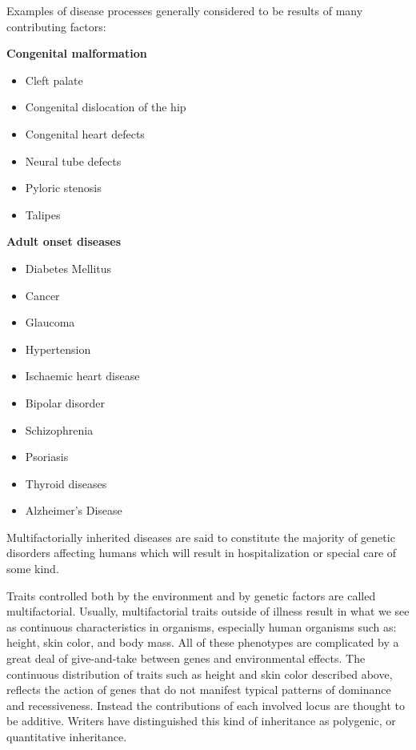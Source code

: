 Examples of disease processes generally considered to be results of many contributing factors:

\textbf{Congenital malformation}

\begin{itemize}
\tightlist
\item
  Cleft palate
\item
  Congenital dislocation of the hip
\item
  Congenital heart defects
\item
  Neural tube defects
\item
  Pyloric stenosis
\item
  Talipes
\end{itemize}

\textbf{Adult onset diseases}

\begin{itemize}
\tightlist
\item
  Diabetes Mellitus
\item
  Cancer
\item
  Glaucoma
\item
  Hypertension
\item
  Ischaemic heart disease
\item
  Bipolar disorder
\item
  Schizophrenia
\item
  Psoriasis
\item
  Thyroid diseases
\item
  Alzheimer's Disease
\end{itemize}

Multifactorially inherited diseases are said to constitute the majority of genetic disorders affecting humans which will result in hospitalization or special care of some kind.

Traits controlled both by the environment and by genetic factors are called multifactorial. Usually, multifactorial traits outside of illness result in what we see as continuous characteristics in organisms, especially human organisms such as: height, skin color, and body mass. All of these phenotypes are complicated by a great deal of give-and-take between genes and environmental effects. The continuous distribution of traits such as height and skin color described above, reflects the action of genes that do not manifest typical patterns of dominance and recessiveness. Instead the contributions of each involved locus are thought to be additive. Writers have distinguished this kind of inheritance as polygenic, or quantitative inheritance.

